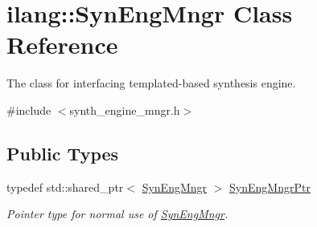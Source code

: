 \hypertarget{classilang_1_1_syn_eng_mngr}{}\section{ilang\+:\+:Syn\+Eng\+Mngr Class Reference}
\label{classilang_1_1_syn_eng_mngr}


The class for interfacing templated-\/based synthesis engine.  




{\ttfamily \#include $<$synth\+\_\+engine\+\_\+mngr.\+h$>$}

\subsection*{Public Types}
\begin{DoxyCompactItemize}
\item 
\mbox{\label{classilang_1_1_syn_eng_mngr_acaffa3e6981472cc6f0d8d5647dc1baf}} 
typedef std\+::shared\+\_\+ptr$<$ \mbox{\hyperlink{classilang_1_1_syn_eng_mngr}{Syn\+Eng\+Mngr}} $>$ \mbox{\hyperlink{classilang_1_1_syn_eng_mngr_acaffa3e6981472cc6f0d8d5647dc1baf}{Syn\+Eng\+Mngr\+Ptr}}
\begin{DoxyCompactList}\small\item\em Pointer type for normal use of \mbox{\hyperlink{classilang_1_1_syn_eng_mngr}{Syn\+Eng\+Mngr}}. \end{DoxyCompactList}\end{DoxyCompactItemize}
